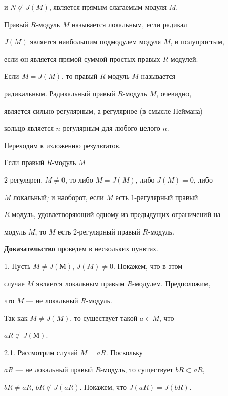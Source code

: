 и $N \not\subset J(M)$, является прямым слагаемым модуля $M$.


Правый $R$-модуль $M$ называется локальным, если радикал


$J(M)$ является наибольшим подмодулем модуля $M$, и полупростым,


если он является прямой суммой простых правых $R$-модулей.


Если $M=J(M)$, то правый $R$-модуль $M$ называется


радикальным. Радикальный правый $R$-модуль $M$, очевидно,


является сильно регулярным, а регулярное (в смысле Неймана)


кольцо является $n$-регулярным для любого целого $n$.


Переходим к изложению результатов.





\begin{thm} Если правый $R$-модуль $M$


$2$-регулярен, $M \ne 0$, то либо $M=J(M)$, либо $J(M)=0$, либо


$M$ локальный{\em ;} и наоборот, если $M$ есть $1$-регулярный правый


$R$-модуль, удовлетворяющий одному из предыдущих ограничений на


модуль $M$, то $M$ есть $2$-регулярный правый $R$-модуль.


\end{thm}





{\bf Доказательство} проведем в нескольких пунктах.





1. Пусть $M \ne J(М)$, $J(M) \ne 0$. Покажем, что в этом


случае $M$ является локальным правым $R$-модулем. Предположим,


что $M$ --- не локальный $R$-модуль.


Так как $M \ne J(M)$, то существует такой $a \in M$, что


$aR \not\subset J(М)$.





2.1. Рассмотрим случай $M=aR$. Поскольку


$aR$ --- не локальный правый $R$-модуль, то существует $bR \subset aR$,


$bR \not= aR$, $bR \not\subset J(aR)$. Покажем, что $J(aR)=J(bR)$.


